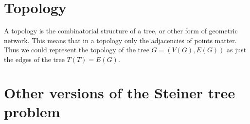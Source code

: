 



\section{Topology}
\label{sec:topology}

A topology is the combinatorial structure of a tree, or other form of geometric
network. This means that in a topology only the adjacencies of points
matter. Thus we could represent the topology of the tree $G = (V(G), E(G))$ as
just the edges of the tree $T(T) = E(G)$.

\section{Other versions of the Steiner tree problem}
\label{sec:other-vers-stein}


\chapterbreak{}

